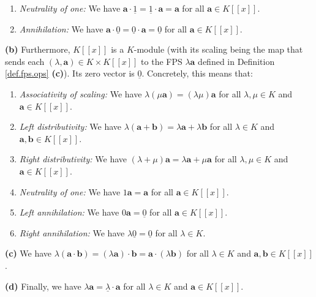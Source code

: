 \begin{theorem}
\begin{enumerate}
\item \emph{Neutrality of one:} We have $\mathbf{a}\cdot\underline{1}%
=\underline{1}\cdot\mathbf{a}=\mathbf{a}$ for all $\mathbf{a}\in K\left[
\left[x\right]\right]$.

\item \emph{Annihilation:} We have $\mathbf{a}\cdot\underline{0}%
=\underline{0}\cdot\mathbf{a}=\underline{0}$ for all $\mathbf{a}\in K\left[
\left[x\right]\right]$.
\end{enumerate}

\textbf{(b)} Furthermore, $K\left[\left[x\right]\right]$ is a
$K$-module (with its scaling being the map that sends each $\left(
\lambda,\mathbf{a}\right) \in K\times K\left[\left[x\right]\right]$
to the FPS $\lambda\mathbf{a}$ defined in Definition \ref{def.fps.ops}
\textbf{(c)}). Its zero vector is $\underline{0}$. Concretely, this means that:

\begin{enumerate}
\item[10.] \emph{Associativity of scaling:} We have $\lambda\left(
\mu\mathbf{a}\right)  =\left(  \lambda\mu\right)  \mathbf{a}$ for all
$\lambda,\mu\in K$ and $\mathbf{a}\in K\left[\left[x\right]\right]$.

\item[11.] \emph{Left distributivity:} We have $\lambda\left(  \mathbf{a}%
+\mathbf{b}\right)  =\lambda\mathbf{a}+\lambda\mathbf{b}$ for all $\lambda\in
K$ and $\mathbf{a},\mathbf{b}\in K\left[\left[x\right]\right]$.

\item[12.] \emph{Right distributivity:} We have $\left(  \lambda+\mu\right)
\mathbf{a}=\lambda\mathbf{a}+\mu\mathbf{a}$ for all $\lambda,\mu\in K$ and
$\mathbf{a}\in K\left[\left[x\right]\right]$.

\item[13.] \emph{Neutrality of one:} We have $1\mathbf{a}=\mathbf{a}$ for all
$\mathbf{a}\in K\left[\left[x\right]\right]$.

\item[14.] \emph{Left annihilation:} We have $0\mathbf{a}=\underline{0}$ for
all $\mathbf{a}\in K\left[\left[x\right]\right]$.

\item[15.] \emph{Right annihilation:} We have $\lambda\underline{0}%
=\underline{0}$ for all $\lambda\in K$.
\end{enumerate}

\textbf{(c)} We have $\lambda\left(\mathbf{a}\cdot\mathbf{b}\right)
=\left(\lambda\mathbf{a}\right)\cdot\mathbf{b}=\mathbf{a}\cdot\left(
\lambda\mathbf{b}\right)$ for all $\lambda\in K$ and $\mathbf{a}%
,\mathbf{b}\in K\left[\left[x\right]\right]$. \medskip

\textbf{(d)} Finally, we have $\lambda\mathbf{a}=\underline{\lambda}%
\cdot\mathbf{a}$ for all $\lambda\in K$ and $\mathbf{a}\in K\left[\left[
x\right]\right]$.
\end{theorem}

